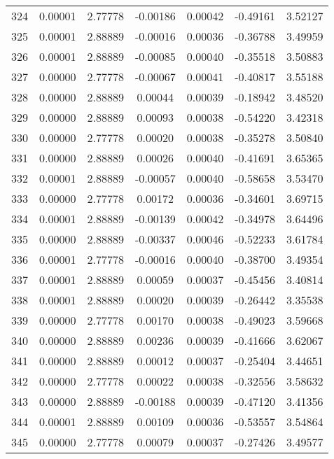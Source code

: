 \begin{longtable}{c c c c c c c}
324 &  0.00001 &      2.77778 & -0.00186 &   0.00042 &  -0.49161 &   3.52127 \\
325 &  0.00001 &      2.88889 & -0.00016 &   0.00036 &  -0.36788 &   3.49959 \\
326 &  0.00001 &      2.88889 & -0.00085 &   0.00040 &  -0.35518 &   3.50883 \\
327 &  0.00000 &      2.77778 & -0.00067 &   0.00041 &  -0.40817 &   3.55188 \\
328 &  0.00000 &      2.88889 &  0.00044 &   0.00039 &  -0.18942 &   3.48520 \\
329 &  0.00000 &      2.88889 &  0.00093 &   0.00038 &  -0.54220 &   3.42318 \\
330 &  0.00000 &      2.77778 &  0.00020 &   0.00038 &  -0.35278 &   3.50840 \\
331 &  0.00000 &      2.88889 &  0.00026 &   0.00040 &  -0.41691 &   3.65365 \\
332 &  0.00001 &      2.88889 & -0.00057 &   0.00040 &  -0.58658 &   3.53470 \\
333 &  0.00000 &      2.77778 &  0.00172 &   0.00036 &  -0.34601 &   3.69715 \\
334 &  0.00001 &      2.88889 & -0.00139 &   0.00042 &  -0.34978 &   3.64496 \\
335 &  0.00000 &      2.88889 & -0.00337 &   0.00046 &  -0.52233 &   3.61784 \\
336 &  0.00001 &      2.77778 & -0.00016 &   0.00040 &  -0.38700 &   3.49354 \\
337 &  0.00001 &      2.88889 &  0.00059 &   0.00037 &  -0.45456 &   3.40814 \\
338 &  0.00001 &      2.88889 &  0.00020 &   0.00039 &  -0.26442 &   3.35538 \\
339 &  0.00000 &      2.77778 &  0.00170 &   0.00038 &  -0.49023 &   3.59668 \\
340 &  0.00000 &      2.88889 &  0.00236 &   0.00039 &  -0.41666 &   3.62067 \\
341 &  0.00000 &      2.88889 &  0.00012 &   0.00037 &  -0.25404 &   3.44651 \\
342 &  0.00000 &      2.77778 &  0.00022 &   0.00038 &  -0.32556 &   3.58632 \\
343 &  0.00000 &      2.88889 & -0.00188 &   0.00039 &  -0.47120 &   3.41356 \\
344 &  0.00001 &      2.88889 &  0.00109 &   0.00036 &  -0.53557 &   3.54864 \\
345 &  0.00000 &      2.77778 &  0.00079 &   0.00037 &  -0.27426 &   3.49577 \\

\end{longtable}
